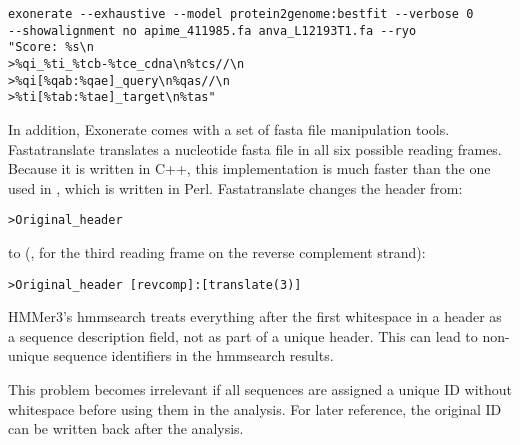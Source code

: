 \begin{verbatim}
exonerate --exhaustive --model protein2genome:bestfit --verbose 0 
--showalignment no apime_411985.fa anva_L12193T1.fa --ryo 
"Score: %s\n
>%qi_%ti_%tcb-%tce_cdna\n%tcs//\n
>%qi[%qab:%qae]_query\n%qas//\n
>%ti[%tab:%tae]_target\n%tas" 
\end{verbatim}

In addition, Exonerate comes with a set of fasta file manipulation tools.
Fastatranslate translates a nucleotide fasta file in all six possible reading
frames. Because it is written in C++, this implementation is much faster than the
one used in \hamstr, which is written in Perl. Fastatranslate changes the
header from:

\begin{verbatim}
>Original_header
\end{verbatim}

to (\eg, for the third reading frame on the reverse complement strand):

\begin{verbatim}
>Original_header [revcomp]:[translate(3)]
\end{verbatim}

HMMer3's hmmsearch treats everything after the first whitespace in a header as a
sequence description field, not as part of a unique header. This can lead to
non-unique sequence identifiers in the hmmsearch results. 

\label{uniq}
This problem becomes irrelevant if all sequences are assigned a unique ID
without whitespace before using them in the analysis. For later reference, the
original ID can be written back after the analysis. 
